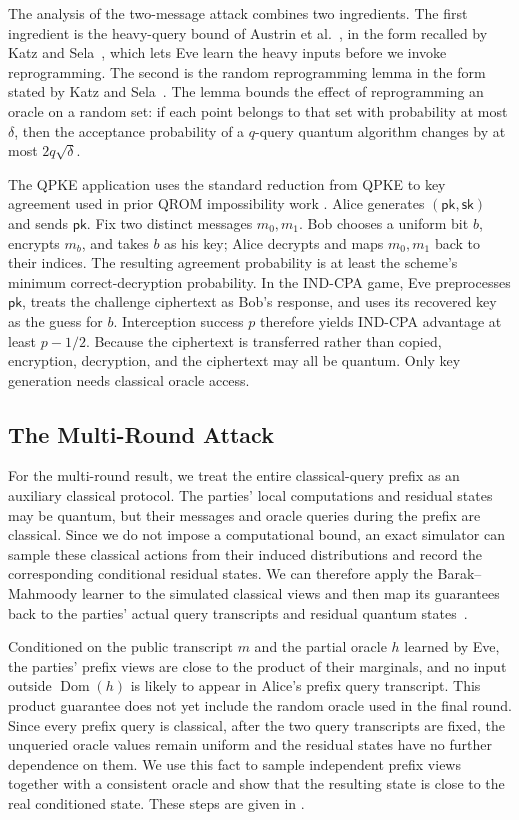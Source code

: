 \documentclass[11pt]{article}
\newcounter{algorithm}
\newcommand{\Dom}{\operatorname{Dom}}
\newcommand{\pk}{\mathsf{pk}}
\newcommand{\sk}{\mathsf{sk}}
\begin{document}
The analysis of the two-message attack combines two ingredients. The
first ingredient is the heavy-query bound of Austrin et
al.~\cite[Lemma~3.4]{AustrinEtAl22}, in the form recalled by Katz and
Sela~\cite[Lemma~4]{KatzSela24}, which lets Eve learn the heavy inputs
before we invoke reprogramming. The second is the random
reprogramming lemma in the form stated by Katz and
Sela~\cite[Lemma~3]{KatzSela24}. The lemma bounds the effect
of reprogramming an oracle on a random set: if each point belongs to that set
with probability at most \(\delta\), then the acceptance probability of a
\(q\)-query quantum algorithm changes by at most \(2q\sqrt\delta\). 

The QPKE application uses the standard reduction from QPKE to key
agreement used in prior QROM impossibility work
\cite{BouazizEtAl24,LiEtAl24}. Alice generates
\((\pk,\sk)\) and sends \(\pk\). Fix two distinct messages \(m_0,m_1\).
Bob chooses a uniform bit \(b\), encrypts \(m_b\), and takes \(b\) as his
key; Alice decrypts and maps \(m_0,m_1\) back to their indices. The resulting
agreement probability is at least the scheme's minimum correct-decryption
probability. In the IND-CPA game, Eve preprocesses \(\pk\), treats the
challenge ciphertext as Bob's response, and uses its recovered key as the
guess for \(b\). Interception success \(p\) therefore yields IND-CPA
advantage at least \(p-1/2\). Because the ciphertext is transferred rather
than copied, encryption, decryption, and the ciphertext may all be quantum.
Only key generation needs classical oracle access.

\subsection{The Multi-Round Attack}

For the multi-round result, we treat the entire classical-query prefix as an
auxiliary classical protocol.  The parties' local computations and residual
states may be quantum, but their messages and oracle queries during the
prefix are classical.  Since we do not impose a computational bound, an
exact simulator can sample these classical actions from their induced
distributions and record the corresponding conditional residual states.  We
can therefore apply the Barak--Mahmoody learner to the simulated classical
views and then map its guarantees back to the parties' actual query
transcripts and residual quantum states~\cite{BarakMahmoodyFull}.

Conditioned on the public transcript \(m\) and the partial oracle \(h\)
learned by Eve, the parties' prefix views are close to the product of their
marginals, and no input outside \(\Dom(h)\) is likely to appear in Alice's
prefix query transcript.  This product guarantee does not yet include the
random oracle used in the final round.  Since every prefix query is
classical, after the two query transcripts are fixed, the unqueried oracle
values remain uniform and the residual states have no further dependence on
them.  We use this fact to sample independent prefix views together with a
consistent oracle and show that the resulting state is close to the real
conditioned state.  These steps are given in
.
\end{document}
